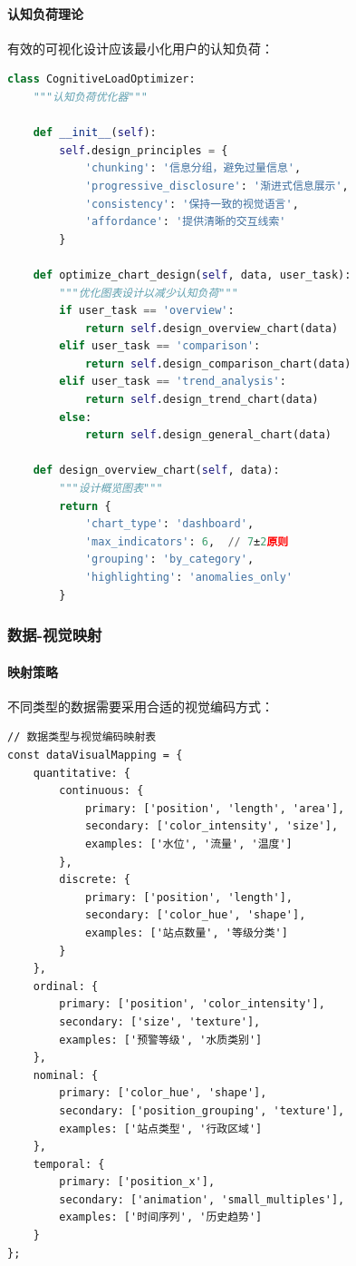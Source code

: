 \paragraph{认知负荷理论}\label{ux8ba4ux77e5ux8d1fux8377ux7406ux8bba}

有效的可视化设计应该最小化用户的认知负荷：

\begin{lstlisting}[language=Python]
class CognitiveLoadOptimizer:
    """认知负荷优化器"""
    
    def __init__(self):
        self.design_principles = {
            'chunking': '信息分组，避免过量信息',
            'progressive_disclosure': '渐进式信息展示',
            'consistency': '保持一致的视觉语言',
            'affordance': '提供清晰的交互线索'
        }
    
    def optimize_chart_design(self, data, user_task):
        """优化图表设计以减少认知负荷"""
        if user_task == 'overview':
            return self.design_overview_chart(data)
        elif user_task == 'comparison':
            return self.design_comparison_chart(data)
        elif user_task == 'trend_analysis':
            return self.design_trend_chart(data)
        else:
            return self.design_general_chart(data)
    
    def design_overview_chart(self, data):
        """设计概览图表"""
        return {
            'chart_type': 'dashboard',
            'max_indicators': 6,  // 7±2原则
            'grouping': 'by_category',
            'highlighting': 'anomalies_only'
        }
\end{lstlisting}

\subsubsection{数据-视觉映射}\label{ux6570ux636e-ux89c6ux89c9ux6620ux5c04}

\paragraph{映射策略}\label{ux6620ux5c04ux7b56ux7565}

不同类型的数据需要采用合适的视觉编码方式：

\begin{lstlisting}
// 数据类型与视觉编码映射表
const dataVisualMapping = {
    quantitative: {
        continuous: {
            primary: ['position', 'length', 'area'],
            secondary: ['color_intensity', 'size'],
            examples: ['水位', '流量', '温度']
        },
        discrete: {
            primary: ['position', 'length'],
            secondary: ['color_hue', 'shape'],
            examples: ['站点数量', '等级分类']
        }
    },
    ordinal: {
        primary: ['position', 'color_intensity'],
        secondary: ['size', 'texture'],
        examples: ['预警等级', '水质类别']
    },
    nominal: {
        primary: ['color_hue', 'shape'],
        secondary: ['position_grouping', 'texture'],
        examples: ['站点类型', '行政区域']
    },
    temporal: {
        primary: ['position_x'],
        secondary: ['animation', 'small_multiples'],
        examples: ['时间序列', '历史趋势']
    }
};
\end{lstlisting}

